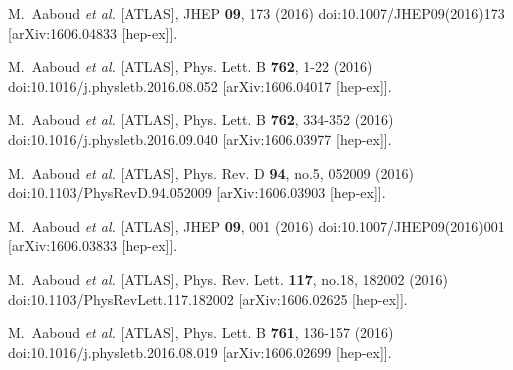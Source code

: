 \begin{thebibliography}{9}
M.~Aaboud \textit{et al.} [ATLAS],
JHEP \textbf{09}, 173 (2016)
doi:10.1007/JHEP09(2016)173
[arXiv:1606.04833 [hep-ex]].

M.~Aaboud \textit{et al.} [ATLAS],
Phys. Lett. B \textbf{762}, 1-22 (2016)
doi:10.1016/j.physletb.2016.08.052
[arXiv:1606.04017 [hep-ex]].

M.~Aaboud \textit{et al.} [ATLAS],
Phys. Lett. B \textbf{762}, 334-352 (2016)
doi:10.1016/j.physletb.2016.09.040
[arXiv:1606.03977 [hep-ex]].

M.~Aaboud \textit{et al.} [ATLAS],
Phys. Rev. D \textbf{94}, no.5, 052009 (2016)
doi:10.1103/PhysRevD.94.052009
[arXiv:1606.03903 [hep-ex]].

M.~Aaboud \textit{et al.} [ATLAS],
JHEP \textbf{09}, 001 (2016)
doi:10.1007/JHEP09(2016)001
[arXiv:1606.03833 [hep-ex]].

M.~Aaboud \textit{et al.} [ATLAS],
Phys. Rev. Lett. \textbf{117}, no.18, 182002 (2016)
doi:10.1103/PhysRevLett.117.182002
[arXiv:1606.02625 [hep-ex]].

M.~Aaboud \textit{et al.} [ATLAS],
Phys. Lett. B \textbf{761}, 136-157 (2016)
doi:10.1016/j.physletb.2016.08.019
[arXiv:1606.02699 [hep-ex]].


\end{thebibliography}
